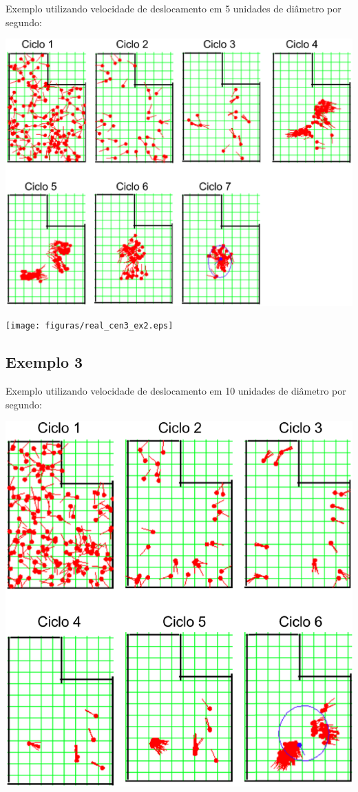 Exemplo utilizando velocidade de deslocamento em 5 unidades de diâmetro por segundo:

{\centering
\includegraphics[scale=0.4]{figuras/cen3_ex2.eps}
\label{img:cen3_ex2}
\par}

{\centering
\texttt{[image: figuras/real\_cen3\_ex2.eps]}
\label{img:real_cen3_ex2}
\par}


\subsection{Exemplo 3}

Exemplo utilizando velocidade de deslocamento em 10 unidades de diâmetro por segundo:

{\centering
\includegraphics[scale=0.4]{figuras/cen3_ex3.eps}
\label{img:cen3_ex3}
\par}

